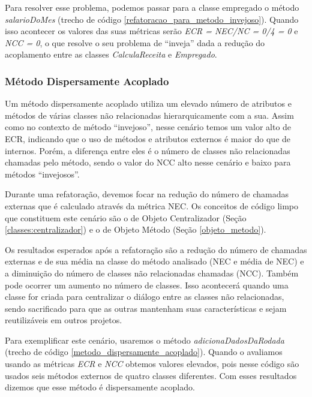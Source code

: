                                       

Para resolver esse problema, podemos passar para a classe empregado o método \textit{salarioDoMes} (trecho de código \ref{refatoracao_para_metodo_invejoso}). Quando isso acontecer os valores das suas métricas serão \textit{ECR = NEC/NC = 0/4 = 0} e \textit{NCC = 0}, o que resolve o seu problema de ``inveja'' dada a redução do acoplamento entre as classes \textit{CalculaReceita} e \textit{Empregado}. 




\subsubsection{Método Dispersamente Acoplado}
	
Um método dispersamente acoplado utiliza um elevado número de atributos e métodos de várias classes não relacionadas hierarquicamente com a sua. Assim como no contexto de método ``invejoso'', nesse cenário temos um valor alto de ECR, indicando que o uso de métodos e atributos externos é maior do que de internos. Porém, a diferença entre eles é o número de classes não relacionadas chamadas pelo método, sendo o valor do NCC alto nesse cenário e baixo para métodos ``invejosos''.
	
Durante uma refatoração, devemos focar na redução do número de chamadas externas que é calculado através da métrica NEC. Os conceitos de código limpo que constituem este cenário são o de Objeto Centralizador (Seção \ref{classes:centralizador}) e o de Objeto Método (Seção \ref{objeto_metodo}).
	
Os resultados esperados após a refatoração são a redução do número de chamadas externas e de sua média na classe do método analisado (NEC e média de NEC) e a diminuição do número de classes não relacionadas chamadas (NCC). Também pode ocorrer um aumento no número de classes. Isso acontecerá quando uma classe for criada para centralizar o diálogo entre as classes não relacionadas, sendo sacrificado para que as outras mantenham suas características e sejam reutilizáveis em outros projetos. 
	  
Para exemplificar este cenário, usaremos o método \textit{adicionaDadosDaRodada} (trecho de código \ref{metodo_dispersamente_acoplado}). Quando o avaliamos usando as métricas \textit{ECR} e \textit{NCC} obtemos valores elevados, pois nesse código são usados seis métodos externos de quatro classes diferentes. Com esses resultados dizemos que esse método é dispersamente acoplado.
  
